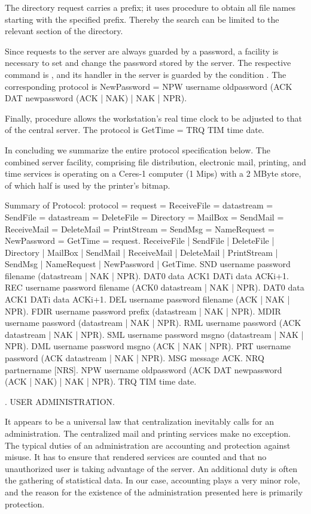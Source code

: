 \noindent The directory request carries a prefix; it uses procedure  to obtain all file names starting with the specified prefix. Thereby the search can be limited to the relevant section of the directory.

Since requests to the server are always guarded by a password, a facility is necessary to set and change the password stored by the server. The respective command is , and its handler in the server is guarded by the condition . The corresponding protocol is
\begintt
NewPassword = NPW username oldpassword
(ACK DAT newpassword (ACK | NAK) | NAK | NPR).
\endtt

\noindent Finally, procedure  allows the workstation's real time clock to be adjusted to that of the central server. The protocol is
\begintt
GetTime = TRQ TIM time date.
\endtt

\noindent In concluding we summarize the entire protocol specification below. The combined server facility, comprising file distribution, electronic mail, printing, and time services is operating on a Ceres-1 computer (1 Mips) with a 2 MByte store, of which half is used by the printer's bitmap.

Summary of Protocol:
\begintt
protocol = request =
ReceiveFile = datastream = SendFile = datastream = DeleteFile = Directory = MailBox = SendMail = ReceiveMail = DeleteMail = PrintStream = SendMsg = NameRequest = NewPassword =
GetTime =
{request}.
ReceiveFile | SendFile | DeleteFile | Directory |
MailBox | SendMail | ReceiveMail | DeleteMail |
PrintStream | SendMsg | NameRequest | NewPassword | GetTime. SND username password filename (datastream | NAK | NPR).
DAT0 data ACK1 {DATi data ACKi+1}.
REC username password filename (ACK0 datastream | NAK | NPR). DAT0 data ACK1 {DATi data ACKi+1}.
DEL username password filename (ACK | NAK | NPR).
FDIR username password prefix (datastream | NAK | NPR).
MDIR username password (datastream | NAK | NPR).
RML username password (ACK datastream | NAK | NPR).
SML username password msgno (datastream | NAK | NPR).
DML username password msgno (ACK | NAK | NPR).
PRT username password (ACK datastream | NAK | NPR).
MSG message ACK.
NRQ partnername [NRS].
NPW username oldpassword
(ACK DAT newpassword (ACK | NAK) | NAK | NPR).
TRQ TIM time date.
\endtt

. USER ADMINISTRATION.

It appears to be a universal law that centralization inevitably calls for an administration. The centralized mail and printing services make no exception. The typical duties of an administration are accounting and protection against misuse. It has to ensure that rendered services are counted and that no unauthorized user is taking advantage of the server. An additional duty is often the gathering of statistical data. In our case, accounting plays a very minor role, and the reason for the existence of the administration presented here is primarily protection.

